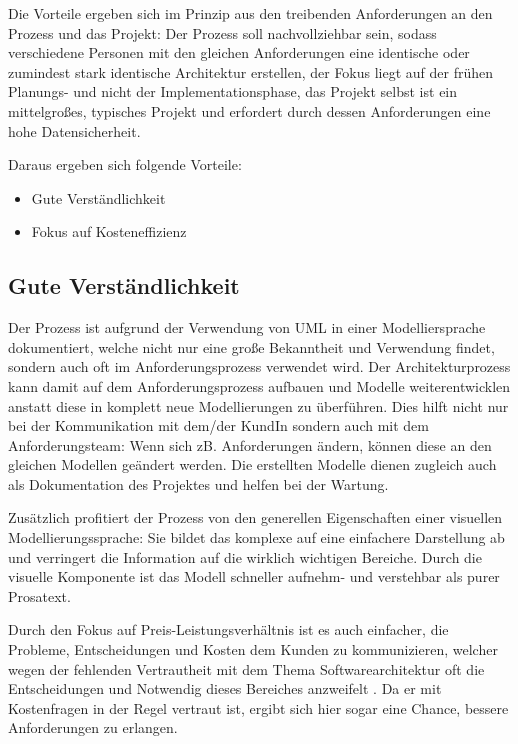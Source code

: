 Die Vorteile ergeben sich im Prinzip aus den treibenden Anforderungen an den Prozess und das Projekt: Der Prozess soll nachvollziehbar sein, sodass verschiedene Personen mit den gleichen Anforderungen eine identische oder zumindest stark identische Architektur erstellen, der Fokus liegt auf der frühen Planungs- und nicht der Implementationsphase, das Projekt selbst ist ein mittelgroßes, typisches Projekt und erfordert durch dessen Anforderungen eine hohe Datensicherheit.

Daraus ergeben sich folgende Vorteile:

\begin{itemize}
  \item Gute Verständlichkeit
  \item Fokus auf Kosteneffizienz
\end{itemize}

\subsection{Gute Verständlichkeit}
Der Prozess ist aufgrund der Verwendung von UML in einer Modelliersprache dokumentiert, welche nicht nur eine große Bekanntheit und Verwendung findet, sondern auch oft im Anforderungsprozess verwendet wird. Der Architekturprozess kann damit auf dem Anforderungsprozess aufbauen und Modelle weiterentwicklen anstatt diese in komplett neue Modellierungen zu überführen. Dies hilft nicht nur bei der Kommunikation mit dem/der KundIn sondern auch mit dem Anforderungsteam: Wenn sich zB. Anforderungen ändern, können diese an den gleichen Modellen geändert werden. Die erstellten Modelle dienen zugleich auch als Dokumentation des Projektes und helfen bei der Wartung.

Zusätzlich profitiert der Prozess von den generellen Eigenschaften einer visuellen Modellierungssprache: Sie bildet das komplexe auf eine einfachere Darstellung ab und verringert die Information auf die wirklich wichtigen Bereiche. Durch die visuelle Komponente ist das Modell schneller aufnehm- und verstehbar als purer Prosatext.

Durch den Fokus auf Preis-Leistungsverhältnis ist es auch einfacher, die Probleme, Entscheidungen und Kosten dem Kunden zu kommunizieren, welcher wegen der fehlenden Vertrautheit mit dem Thema Softwarearchitektur oft die Entscheidungen und Notwendig dieses Bereiches anzweifelt \cite[S. 8-9]{softarch}. Da er mit Kostenfragen in der Regel vertraut ist, ergibt sich hier sogar eine Chance, bessere Anforderungen zu erlangen.

